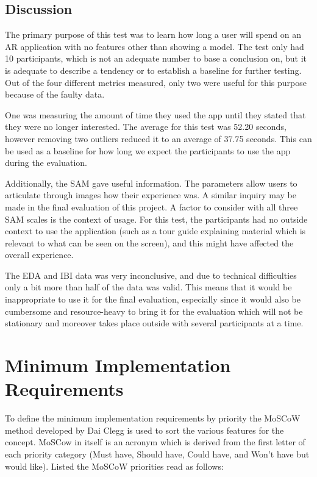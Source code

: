 \subsection{Discussion}
The primary purpose of this test was to learn how long a user will spend on an AR application with no features other than showing a model. The test only had 10 participants, which is not an adequate number to base a conclusion on, but it is adequate to describe a tendency or to establish a baseline for further testing. Out of the four different metrics measured, only two were useful for this purpose because of the faulty data. 

One was measuring the amount of time they used the app until they stated that they were no longer interested. The average for this test was 52.20 seconds, however removing two outliers reduced it to an average of 37.75 seconds. This can be used as a baseline for how long we expect the participants to use the app during the evaluation.

Additionally, the SAM gave useful information. The parameters allow users to articulate through images how their experience was. A similar inquiry may be made in the final evaluation of this project. A factor to consider with all three SAM scales is the context of usage. For this test, the participants had no outside context to use the application (such as a tour guide explaining material which is relevant to what can be seen on the screen), and this might have affected the overall experience. 

The EDA and IBI data was very inconclusive, and due to technical difficulties only a bit more than half of the data was valid. This means that it would be inappropriate to use it for the final evaluation, especially since it would also be cumbersome and resource-heavy to bring it for the evaluation which will not be stationary and moreover takes place outside with several participants at a time.

\section{Minimum Implementation Requirements}
To define the minimum implementation requirements by priority the MoSCoW method developed by Dai Clegg  is used to sort the various features for the concept. MoSCow in itself is an acronym which is derived from the first letter of each priority category (Must have, Should have, Could have, and Won’t have but would like). Listed the MoSCoW priorities read as follows:

